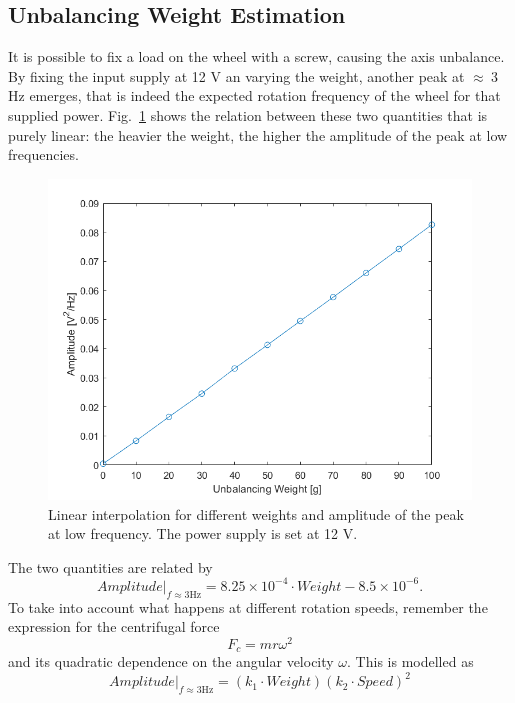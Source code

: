 \documentclass[12pt]{article}
\begin{document}
	\subsection{Unbalancing Weight Estimation}
	It is possible to fix a load on the wheel with a screw, causing the axis unbalance. By fixing the input supply at 12 V an varying the weight, another peak at $\approx\ $3 Hz emerges, that is indeed the expected rotation frequency of the wheel for that supplied power. Fig.~\ref{fig:weightfeature} shows the relation between these two quantities that is purely linear: the heavier the weight, the higher the amplitude of the peak at low frequencies.
		\begin{figure}[h]
			\centering
			\includegraphics[width=0.9\linewidth]{Figures/WeightFeature}
			\caption{Linear interpolation for different weights and amplitude of the peak at low frequency. The power supply is set at 12 V.}
			\label{fig:weightfeature}
		\end{figure}
	The two quantities are related by
	\begin{equation}\label{eq:weight}
	Amplitude\bigr|_{f\approx 3 \text{Hz}} = 8.25 \times 10^{−4}\cdot Weight - 8.5\times 10^{−6}.
	\end{equation}
	To take into account what happens at different rotation speeds, remember the expression for the centrifugal force
	\begin{equation}
		F_c = mr\omega^2	
	\end{equation}
	and its quadratic dependence on the angular velocity $\omega$. This is modelled as	
	\begin{equation}\label{eq:feature2}
		Amplitude\bigr|_{f\approx 3 \text{Hz}} = \left(k_1\cdot Weight\right)\left(k_2\cdot Speed\right)^2
	\end{equation}
\end{document}
